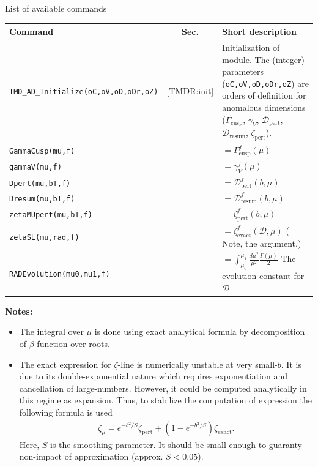 \documentclass[prd,nofootinbib,eqsecnum,final]{revtex4}
\renewcommand{\(}{\left(}
\renewcommand{\)}{\right)}
\renewcommand{\[}{\left[}
\renewcommand{\]}{\right]}
\newcommand{\blue}[1]{{\color{blue} #1}}
\begin{document}
\begin{center}
List of available commands
\\
\begin{tabular}{||l|c|p{10cm}||}
\hline\hline
Command & ~~Sec.~~ & Short description
\\\hline
\texttt{TMD\_AD\_Initialize(oC,oV,oD,oDr,oZ) } & \ref{TMDR:init} & Initialization of module. The (integer) parameters (\texttt{oC,oV,oD,oDr,oZ}) are orders of definition for anomalous dimensions ($\Gamma_{\text{cusp}}$, $\gamma_V$, $\mathcal{D}_{\text{pert}}$, $\mathcal{D}_{\text{resum}}$, $\zeta_{\text{pert}}$).
\\\hline
\texttt{GammaCusp(mu,f)} &  & $=\Gamma_{\text{cusp}}^f(\mu)$
\\\hline
\texttt{gammaV(mu,f)} &  & $=\gamma_V^f(\mu)$
\\\hline
\texttt{Dpert(mu,bT,f)} &  & $=\mathcal{D}_{\text{pert}}^f(b,\mu)$
\\\hline
\texttt{Dresum(mu,bT,f)} & &  $=\mathcal{D}_{\text{resum}}^f(b,\mu)$
\\\hline
\texttt{zetaMUpert(mu,bT,f)} &  & $=\zeta_{\text{pert}}^f(b,\mu)$
\\\hline
\texttt{zetaSL(mu,rad,f)} & &  $=\zeta_{\text{exact}}^f(\mathcal{D},\mu)$ (\blue{Note, the argument.})
\\\hline
\texttt{RADEvolution(mu0,mu1,f)} & &  $=\int_{\mu_0}^{\mu_1} \frac{d\mu^2}{\mu^2}\frac{\Gamma(\mu)}{2}$ The evolution constant for $\mathcal{D}$
\\
\hline\hline
\end{tabular}
\end{center}

\textbf{Notes:}
\begin{itemize}
\item The integral over $\mu$ is done using exact analytical formula by decomposition of $\beta$-function over roots. 
\item The exact expression for $\zeta$-line is numerically unstable at very small-$b$. It is due to its double-exponential nature which requires exponentiation and cancellation of large-numbers. However, it could be computed analytically in this regime as expansion. Thus, to stabilize the computation of expression the following formula is used
\begin{eqnarray}
\zeta_\mu = e^{-b^2/S}\zeta_\text{pert}+(1-e^{-b^2/S})\zeta_\text{exact}.
\end{eqnarray}
Here, $S$ is the smoothing parameter. It should be small enough to guaranty non-impact of approximation (approx. $S<0.05$).
\end{itemize}
\end{document}
